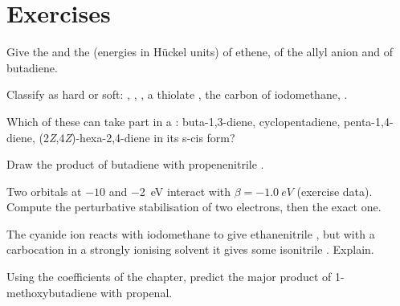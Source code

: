 \section{Exercises}

\begin{exercise}[$\star$]\label{exo:b2:frontier-orbitals:1}
Give the  and the  (energies in Hückel units) of ethene, of the allyl anion
and of butadiene.
\end{exercise}

\begin{exercise}[$\star$]\label{exo:b2:frontier-orbitals:2}
Classify as hard or soft: , , , a thiolate , the carbon of
iodomethane, .
\end{exercise}

\begin{exercise}[$\star$]\label{exo:b2:frontier-orbitals:3}
Which of these  can take part in a : buta-1,3-diene,
cyclopentadiene, penta-1,4-diene, (2\textit{Z},4\textit{Z})-hexa-2,4-diene in its s-cis
form?
\end{exercise}

\begin{exercise}[$\star$]\label{exo:b2:frontier-orbitals:4}
Draw the product of butadiene with propenenitrile .
\end{exercise}

\begin{exercise}[$\star\star$]\label{exo:b2:frontier-orbitals:5}
Two orbitals at $-10$ and \qty{-2}{eV} interact with $\beta = \qty{-1.0}{eV}$ (exercise data).
Compute the perturbative stabilisation of two electrons, then the exact one.
\end{exercise}

\begin{exercise}[$\star\star$]\label{exo:b2:frontier-orbitals:6}
The cyanide ion reacts with iodomethane to give ethanenitrile , but with a
carbocation in a strongly ionising solvent it gives some isonitrile . Explain.
\end{exercise}

\begin{exercise}[$\star\star$]\label{exo:b2:frontier-orbitals:7}
Using the coefficients of the chapter, predict the major product of 1-methoxybutadiene
with propenal.
\end{exercise}


